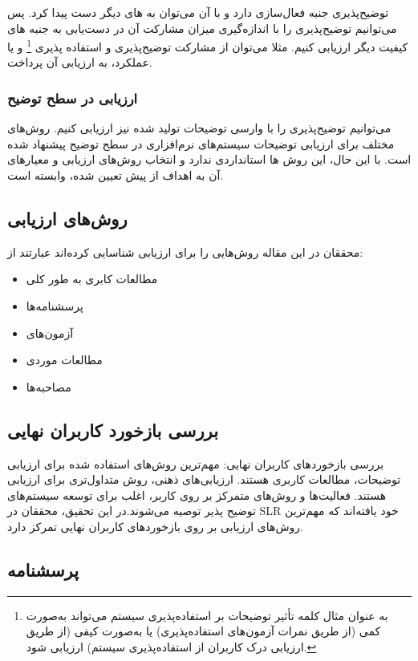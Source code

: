 توضیح‌پذیری جنبه فعال‌سازی دارد و با آن می‌توان به  های دیگر دست پیدا
کرد. پس می‌توانیم توضیح‌پذیری را با اندازه‌گیری میزان مشارکت آن در دست‌یابی به
جنبه های کیفیت دیگر ارزیابی کنیم. مثلا می‌توان از مشارکت توضیح‌پذیری و استفاده
پذیری \footnote{ به عنوان مثال کلمه  تأثیر توضیحات بر
استفاده‌پذیری سیستم می‌تواند به‌صورت کمی (از طریق نمرات آزمون‌های استفاده‌پذیری)
یا به‌صورت کیفی (از طریق ارزیابی درک کاربران از استفاده‌پذیری سیستم) ارزیابی
شود.} و یا عملکرد، به ارزیابی آن پرداخت.

\subsubsection{ارزیابی در سطح توضیح}

می‌توانیم توضیح‌پذیری را با وارسی توضیحات تولید شده نیز ارزیابی کنیم. روش‌های
مختلف برای ارزیابی توضیحات سیستم‌های نرم‌افزاری در سطح توضیح پیشنهاد شده است. با
این حال، این روش ها استانداردی ندارد و انتخاب روش‌های ارزیابی و معیارهای آن به
اهداف از پیش تعیین شده، وابسته است.

\subsection{روش‌های ارزیابی}

محققان در این مقاله روش‌هایی را برای ارزیابی شناسایی کرده‌اند عبارتند از:

\begin{itemize}
    \item مطالعات کابری به طور کلی
    \item پرسشنامه‌ها
    \item آزمون‌های 
    \item مطالعات موردی
    \item مصاحبه‌ها
\end{itemize}

\subsection{بررسی بازخورد کاربران نهایی}

بررسی بازخوردهای کاربران نهایی: مهم‌ترین روش‌های استفاده شده برای ارزیابی
توضیحات، مطالعات کاربری هستند. ارزیابی‌های ذهنی، روش متداول‌تری برای ارزیابی
هستند. فعالیت‌ها و روش‌های متمرکز بر روی کاربر، اغلب برای توسعه سیستم‌های توضیح
پذیر توصیه می‌شوند.در این تحقیق، محققان در SLR خود یافته‌اند که مهم‌ترین روش‌های
ارزیابی بر روی بازخوردهای کاربران نهایی تمرکز دارد.

\subsection{پرسشنامه}

